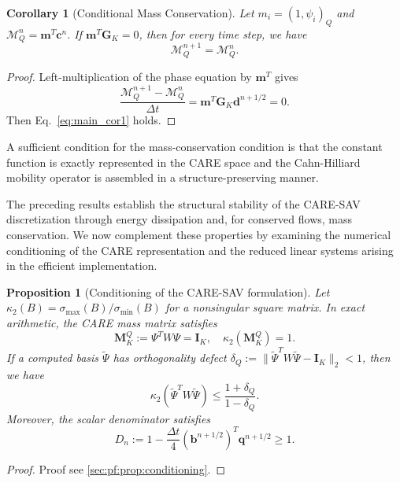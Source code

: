 \documentclass[10pt,reqno]{amsart}
\newtheorem{col}{Corollary}[section]
\newtheorem{prop}{Proposition}[section]
\newenvironment{proposition}{\begin{prop}}{\end{prop}}
\newenvironment{corollary}{\begin{col}}{\end{col}}
\theoremstyle{remark}
\theoremstyle{definition}
\begin{document}
\begin{corollary}[Conditional Mass Conservation]
  Let $m_i=(1,\psi_i)_Q$ and $\mathcal M_Q^n=\boldsymbol m^{T}\boldsymbol c^n$.
  If $\boldsymbol m^{T}\boldsymbol{G}_K=0$, then for every time step, we have
  \begin{equation}
  \label{eq:main_cor1}
    \mathcal M_Q^{n+1}=\mathcal M_Q^n.
  \end{equation}
\end{corollary}
\begin{proof}
  Left-multiplication of the phase equation by $\boldsymbol m^{T}$ gives
  $$
  \frac{\mathcal M_Q^{n+1}-\mathcal M_Q^n}{\Delta t} =\boldsymbol m^{T}\boldsymbol{G}_K\boldsymbol d^{n+1/2}=0.
  $$
  Then Eq.~\eqref{eq:main_cor1} holds.
\end{proof}

A sufficient condition for the mass-conservation condition is that the constant function is exactly represented in the CARE space and the Cahn-Hilliard mobility operator is assembled in a structure-preserving manner.

The preceding results establish the structural stability of the CARE-SAV discretization through energy dissipation and, for conserved flows, mass conservation. We now complement these properties by examining the numerical conditioning of the CARE representation and the reduced linear systems arising in the efficient implementation.

\begin{proposition}[Conditioning of the CARE-SAV formulation]
\label{prop:Conditioning of the CARE-SAV formulation}
  Let $\kappa_2(B)=\sigma_{\max}(B)/\sigma_{\min}(B)$ for a nonsingular square matrix. In exact arithmetic, the CARE mass matrix satisfies
  \begin{equation}
  \label{eq:main1_prop2}
    \boldsymbol{M}_K^Q:=\Psi^{T} W\Psi=\boldsymbol{I}_K, \quad \kappa_2(\boldsymbol{M}_K^Q)=1.
  \end{equation}
  If a computed basis $\widetilde\Psi $ has orthogonality defect $\delta_Q:=\|\widetilde\Psi^{T} W\widetilde\Psi-\boldsymbol{I}_K\|_2<1$, then we have
  \begin{equation}
  \label{eq:main2_prop2}
    \kappa_2(\widetilde\Psi^{T} W\widetilde\Psi) \le \frac{1+\delta_Q}{1-\delta_Q}.
  \end{equation}
  Moreover, the scalar denominator satisfies
  \begin{equation}
  \label{eq:main3_prop2}
    D_n:=1-\frac{\Delta t}{4}(\boldsymbol b^{n+1/2})^{T}\boldsymbol q^{n+1/2}\ge1.
  \end{equation}
\end{proposition}
\begin{proof}
  Proof see \cref{sec:pf:prop:conditioning}.
\end{proof}
\end{document}
